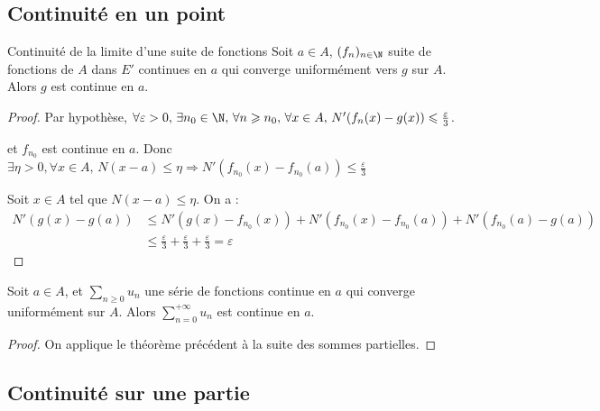 \subsection{Continuité en un point }

\begin{proposition}{Continuité de la limite d'une suite de fonctions}{}
    Soit $a \in A$, $(f_n)_{n \in \N}$ suite de fonctions de $A$ dans $E'$ continues en $a$ qui converge 
    uniformément vers $g$ sur $A$. Alors $g$ est continue en $a$.
\end{proposition}


\begin{proof}
    Par hypothèse, $\forall \varepsilon > 0, \, \exists n_0 \in \N, \, \forall n \geqslant n_0, \, \forall x \in A, \, N'(f_n(x) - g(x)) \leqslant \frac \varepsilon 3$.

    et $f_{n_0}$ est continue en $a$. Donc $\exists \eta > 0, \forall x \in A, \, N(x - a) \leqslant \eta \Rightarrow N'(f_{n_0}(x) - f_{n_0}(a)) \leqslant \frac \varepsilon 3$

    Soit $x \in A$ tel que $N(x - a) \leqslant \eta$. On a :
    \begin{align}
        N'(g(x) - g(a)) & \leqslant N'(g(x) - f_{n_0}(x)) + N'(f_{n_0}(x) - f_{n_0}(a)) + N'(f_{n_0}(a) - g(a)) \\
        & \leqslant \frac \varepsilon 3 + \frac \varepsilon 3 + \frac \varepsilon 3 = \varepsilon
    \end{align}
\end{proof}

\begin{theoreme}{}{}
    Soit $a \in A$, et $\displaystyle \sum_{n \geqslant 0} u_n$ une série de fonctions continue en $a$ qui 
    converge uniformément sur $A$. Alors $\displaystyle \sum_{n = 0}^{+ \infty} u_n$ est continue en $a$.
\end{theoreme}

\begin{proof}
    On applique le théorème précédent à la suite des sommes partielles.
\end{proof}

\subsection{Continuité sur une partie }

